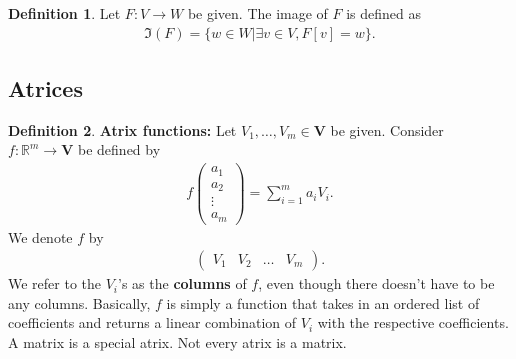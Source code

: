 \documentclass{article}
\theoremstyle{definition}
\newtheorem{defn}{Definition}[section]
\newcommand{\R}{\mathbb{R}}
\begin{document}
\begin{defn}
	Let $F : V \rightarrow W$ be given. The image of $F$ is defined as
	\begin{align*}
	\Im(F) = \{w\in W \vert \exists v\in V, F[v] = w \}. 
	\end{align*}
\end{defn}
\subsection{Atrices}
\begin{defn}
	\textbf{Atrix functions:} Let $V_1,\dots,V_m \in \mathbf{V}$ be given. Consider $f : \R^m \rightarrow \mathbf{V}$ be defined by
	\begin{align*}
	f\begin{pmatrix}
	a_1\\
	a_2\\
	\vdots\\
	a_m
	\end{pmatrix}
	=
	\sum_{i=1}^m a_i V_i.
	\end{align*} 
	We denote $f$ by
	\begin{align*}
	\begin{pmatrix}
	V_1 & V_2 &\dots& V_m
	\end{pmatrix}.
	\end{align*}
	We refer to the $V_i$'s as the \textbf{columns} of $f$, even though there doesn't have to be any columns. Basically, $f$ is simply a function that takes in an ordered list of coefficients and returns a linear combination of $V_i$ with the respective coefficients. A matrix is a special atrix. Not every atrix is a matrix. 
\end{defn}
\end{document}
